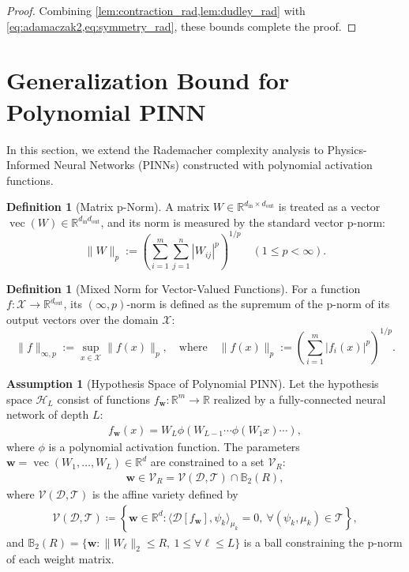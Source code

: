 \documentclass{article}
\theoremstyle{plain}
\theoremstyle{definition}
\newtheorem{definition}[theorem]{Definition}
\newtheorem{assumption}[theorem]{Assumption}
\theoremstyle{remark}
\begin{document}
\begin{proof}
Combining \cref{lem:contraction_rad,lem:dudley_rad} with \cref{eq:adamaczak2,eq:symmetry_rad}, these bounds complete the proof.
\end{proof}

\section{Generalization Bound for Polynomial PINN}
\label{app:poly_pinn}
In this section, we extend the Rademacher complexity analysis to Physics-Informed Neural Networks (PINNs) constructed with polynomial activation functions.

\begin{definition}[Matrix p-Norm]
A matrix $W \in \mathbb{R}^{d_{\mathrm{in}} \times d_{\mathrm{out}}}$ is treated as a vector $\operatorname{vec}(W) \in \mathbb{R}^{d_{\mathrm{in}}d_{\mathrm{out}}}$, and its norm is measured by the standard vector p-norm:
$$
\|W\|_{p} := \left(\sum_{i=1}^{m}\sum_{j=1}^{n}|W_{ij}|^{p}\right)^{1/p} \quad (1 \le p < \infty).
$$
\end{definition}

\begin{definition}[Mixed Norm for Vector-Valued Functions]
For a function $f: \mathcal{X} \to \mathbb{R}^{d_{\mathrm{out}}}$, its $(\infty, p)$-norm is defined as the supremum of the p-norm of its output vectors over the domain $\mathcal{X}$:
$$
\|f\|_{\infty,p} := \sup_{x \in \mathcal{X}} \|f(x)\|_{p}, \quad \text{where} \quad \|f(x)\|_{p} := \left(\sum_{i=1}^{m}|f_i(x)|^{p}\right)^{1/p}.
$$
\end{definition}

\begin{assumption}[Hypothesis Space of Polynomial PINN]
\label{assump:poly_pinn_space}
Let the hypothesis space $\mathcal{H}_L$ consist of functions $f_{\bm{w}}: \mathbb{R}^{m} \to \mathbb{R}$ realized by a fully-connected neural network of depth $L$:
\begin{align*}
    f_{\bm{w}}(x) = W_L \phi( W_{L-1} \cdots \phi(W_1 x) \cdots ),
\end{align*}
where $\phi$ is a polynomial activation function. 
The parameters $\bm{w} = \operatorname{vec}(W_1, \dots, W_L) \in \mathbb{R}^d$ are constrained to a set $\mathcal{V}_R$:
\begin{align*}
    \bm{w} \in \mathcal{V}_R = \mathcal{V}(\mathscr{D}, \mathcal{T}) \cap \mathbb{B}_2(R),
\end{align*}
where $\mathcal{V}(\mathscr{D},\mathcal{T})$ is the affine variety defined by 
\begin{align*}
\label{eq:def-V-dnn}
\mathcal{V}(\mathscr{D},  \mathcal{T}) \coloneqq \left\{ \bm{w} \in \mathbb{R}^d: \langle \mathscr{D}\left[f_{\bm{w}} \right], \psi_k \rangle_{\mu_k} = 0,\ \forall (\psi_k, \mu_k) \in \mathcal{T}\right\},
\end{align*}
and $\mathbb{B}_2(R) = \{ \bm{w} : \|W_{\ell}\|_{2} \le R,\ 1 \le \forall \ell \le L\}$ is a ball constraining the p-norm of each weight matrix.
\end{assumption}
\end{document}
